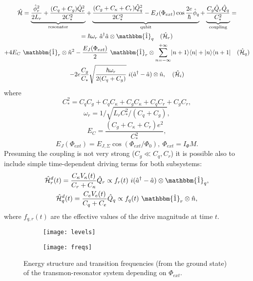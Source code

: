\documentclass[12pt, twoside]{report}
\DeclarePairedDelimiter\bra{\langle}{\rvert}
\DeclarePairedDelimiter\ket{\lvert}{\rangle}
\numberwithin{equation}{section}
\begin{document}
\begin{equation}
\begin{gathered}
\mathcal{\hat H} =  \underbrace{\frac{\hat \phi_r^2}{2 L_r} + \frac{(C_q+C_g) \hat Q_r^2}{2C_*^2}}_\text{resonator} 
+ \underbrace{\frac{(C_g + C_\kappa + C_r) \hat Q^2_q}{2C_*^2} - E_J (\Phi_{ext}) \cos \frac{2e}{\hbar}\hat \phi_q }_\text{qubit}
+ \underbrace{\frac{C_g\hat Q_r \hat Q_q}{C_*^2}}_\text{coupling} = \\
=  \hbar\omega_r\ \hat a^\dag \hat a \otimes \mathbbm{\hat 1}_q \quad (\mathcal{\hat H}_r) \\
+ 4 E_C\ \mathbbm{\hat 1}_r \otimes \hat n^2 - \frac{E_J(\Phi_{ext})}{2}\ \mathbbm{\hat 1}_r\otimes \sum_{n=-\infty}^{+\infty} \ket{n+1}\bra{n} + \ket{n}\bra{n+1} \quad (\mathcal{\hat H}_q) \\
- 2e \frac{C_g}{C_*} \sqrt{\frac{\hbar \omega_r }{2(C_q+C_g)}}\ i(\hat a^\dag - \hat a) \otimes \hat n, \quad (\mathcal{\hat H}_i)
\end{gathered}\label{eq:hamiltonian}
\end{equation}
where 
$$C_*^2 = C_q C_g + C_q C_\kappa + C_g C_\kappa + C_q C_r + C_g C_r, $$
$$\omega_r = 1/\sqrt{L_r C_*^2/(C_q+C_g)}, $$
$$E_C = \frac{(C_g+C_\kappa+C_r)e^2}{C_*^2}, $$
$$E_J(\Phi_{ext}) = E_{J,\Sigma} \cos(\Phi_{ext}/\Phi_0),\ \Phi_{ext} = I_\Phi M.$$
Presuming the coupling is not very strong ($C_g \ll C_q, C_r$) it is possible also to include simple time-dependent driving terms for both subsystems:
\begin{gather}
\mathcal{\hat H}_r^d(t) = \frac{C_\kappa V_\kappa(t)}{C_r + C_\kappa} \hat Q_r \propto f_r(t)\ i(\hat a^\dag - \hat a) \otimes \mathbbm{\hat 1}_q, \notag \\
\mathcal{\hat H}_q^d(t) = \frac{C_e V_e(t)}{C_q + C_e} \hat Q_q \propto f_q(t)\  \mathbbm{\hat 1}_r \otimes \hat n,
\label{eq:driving_q}
\end{gather}
where $f_{q, r} (t)$ are the effective values of the drive magnitude at time $t$.

\begin{figure}
\centering
\begin{subfigure}[t]{\textwidth}
\centering
\texttt{[image: levels]}
\end{subfigure}

\begin{subfigure}[t]{\textwidth}
\centering
\texttt{[image: freqs]}
\end{subfigure}
\caption{Energy structure and transition frequencies (from the ground state) of the transmon-resonator system depending on $\Phi_{ext}$.}
\label{fig:levels}
\end{figure}
\end{document}
